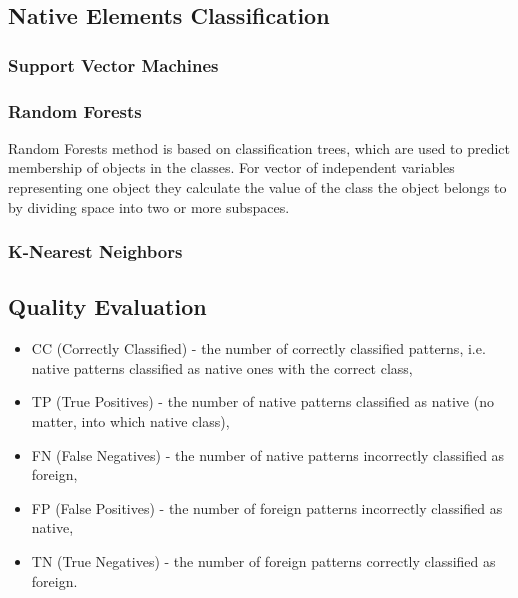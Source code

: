 \documentclass{llncs}
\begin{document}
\subsection{Native Elements Classification}


\subsubsection{Support Vector Machines}
\subsubsection{Random Forests}
Random Forests method is based on classification trees, which are used to predict membership of objects in the classes.
For vector of independent variables representing one object they calculate the value of the class the object belongs to by dividing space into two or more subspaces.
\subsubsection{K-Nearest Neighbors}

\subsection{Quality Evaluation}

\begin{itemize}
\item CC  (Correctly Classified) - the number of correctly classified patterns, i.e. native patterns classified as native ones with the correct class, %
\item TP  (True Positives) - the number of native patterns classified as native (no matter, into which native class),
\item FN  (False Negatives) - the number of native patterns incorrectly classified as foreign,
\item FP  (False Positives) - the number of foreign patterns incorrectly classified as native,
\item TN  (True Negatives) - the number of foreign patterns correctly classified as foreign.
\end{itemize}
\end{document}
